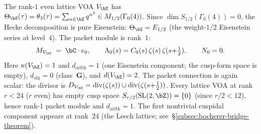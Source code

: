 \begin{example}%
\label{ex:packet-rank1-lattice}%
%
The rank-$1$ even lattice VOA $V_\bZ$ has
$\Theta_\bZ(\tau) = \theta_3(\tau) = \sum_{n\in\bZ}q^{n^2}
\in M_{1/2}(\Gamma_0(4))$.
Since $\dim S_{1/2}(\Gamma_0(4)) = 0$, the Hecke decomposition
is pure Eisenstein:
$\Theta_\bZ = E_{1/2}$ (the weight-$1/2$ Eisenstein series at
level~$4$). The packet module is rank~$1$:
\[
 M_{V_\bZ}
 \;=\;
 \bC\cdot e_0,
 \qquad
 \Lambda_0(s) = C_0(s)\,\zeta(s)\,\zeta(s{+}\tfrac12),
 \qquad
 N_0 = 0.
\]
Here $\kappa(V_\bZ) = 1$ and $d_{\mathrm{arith}} = 1$
(one Eisenstein component; the cusp-form space is empty),
$d_{\mathrm{alg}} = 0$ (class~$\mathbf{G}$), and
$d(V_\bZ) = 2$.
The packet connection is again scalar: the divisor is
$D_{V_\bZ} = \operatorname{div}(\zeta(s)) \cup
\operatorname{div}(\zeta(s{+}\tfrac12))$.
Every lattice VOA at rank $r < 24$ ($r$ even) has empty cusp
space $S_{r/2}(\mathrm{SL}(2,\bZ)) = \{0\}$
(since $r/2 < 12$), hence rank-$1$ packet module and
$d_{\mathrm{arith}} = 1$. The first nontrivial cuspidal
component appears at rank~$24$
(the Leech lattice; see~\S\ref{subsec:bocherer-bridge-theorem}).
\end{example}

